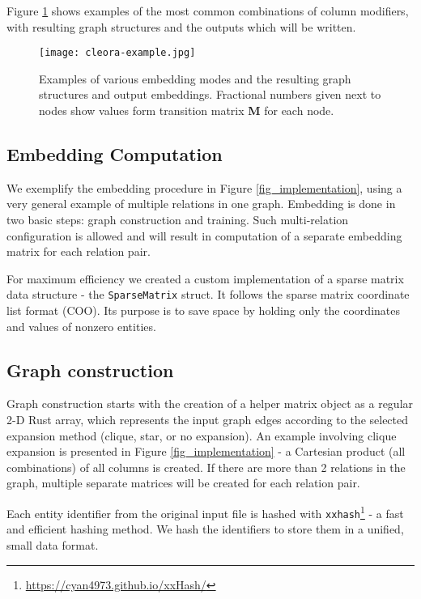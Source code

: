 \documentclass{IEEEtran}
\begin{document}
Figure \ref{fig_cleora-example} shows examples of the most common combinations of column modifiers, with resulting graph structures and the outputs which will be written.

\begin{figure}\centering
\texttt{[image: cleora-example.jpg]}
\caption{Examples of various embedding modes and the resulting graph structures and output embeddings. Fractional numbers given next to nodes show values form transition matrix \textbf{M} for each node.}
\label{fig_cleora-example}
\end{figure}



\subsection{Embedding Computation}
We exemplify the embedding procedure in Figure \ref{fig_implementation}, using a very general example of multiple relations in one graph. Embedding is done in two basic steps: graph construction and training. Such multi-relation configuration is allowed and will result in computation of a separate embedding matrix for each relation pair.

For maximum efficiency we created a custom implementation of a sparse matrix data structure - the \texttt{SparseMatrix} struct. It follows the sparse matrix coordinate list format (COO). Its purpose is to save space by holding only the coordinates and values of nonzero entities.



\subsection{Graph construction} 
Graph construction starts with the creation of a helper matrix  object as a regular 2-D Rust array, which represents the input graph edges  according to the selected expansion method (clique, star, or no expansion). An example involving clique expansion is presented in Figure \ref{fig_implementation} - a Cartesian product (all combinations) of all columns is created. If there are more than 2 relations in the graph, multiple separate  matrices will be created for each relation pair. 

Each entity identifier from the original input file is hashed with \texttt{xxhash}\footnote{\url{https://cyan4973.github.io/xxHash/}} - a fast and efficient hashing method. We hash the identifiers to store them in a unified, small data format.
\end{document}
